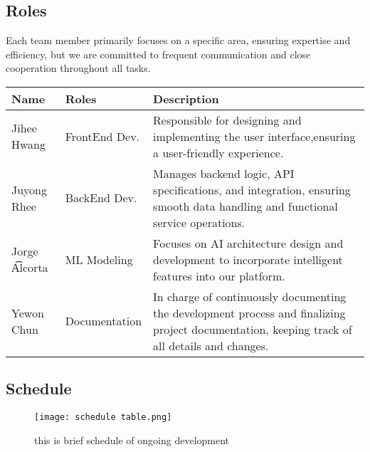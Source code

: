 \documentclass[runningheads]{llncs}
\begin{document}
\begin{spacing}{1.25}
\subsection{Roles}
Each team member primarily focuses on a specific area, ensuring expertise and efficiency, but we are committed to frequent communication and close cooperation throughout all tasks.

\begin{center}
\def\arraystretch{1.0}
\begin{tabular}{ | m{5em} | m{8em} | m{23em} | }
  \hline
  \textbf{Name} & \textbf{Roles} & \textbf{Description} \\ 
  \hline
  Jihee Hwang 
  & FrontEnd Dev. 
  & Responsible for designing and implementing the user interface,ensuring a user-friendly experience.\\
  \hline
  Juyong Rhee 
  & BackEnd Dev. 
  & Manages backend logic, API specifications,
    and integration, ensuring smooth data handling
    and functional service operations. \\
  \hline
  Jorge \t Alcorta 
  & ML Modeling 
  & Focuses on AI architecture design and development to incorporate intelligent features into our platform. \\ 
  \hline
  Yewon Chun 
  & Documentation 
  & In charge of continuously documenting the development process and finalizing project documentation, keeping track of all details and changes. \\
  \hline
\end{tabular}
\end{center}

\subsection{Schedule}
\begin{figure}
\texttt{[image: schedule table.png]}
\caption{this is brief schedule of ongoing development} \label{fig5}
\end{figure}


\end{spacing}
\end{document}
